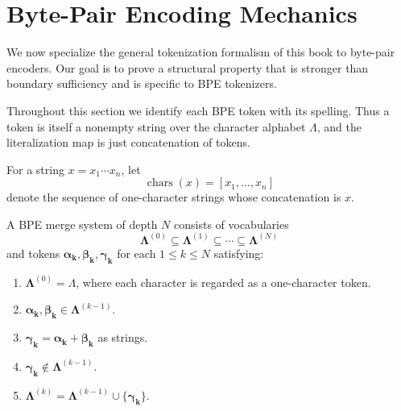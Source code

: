 \section{Byte-Pair Encoding Mechanics}
\label{sec:bpe-mechanics}
\label{sec:appendix-bpe-mechanics}

We now specialize the general tokenization formalism of this book to byte-pair encoders.
Our goal is to prove a structural property that is stronger than boundary sufficiency and is
specific to BPE tokenizers.

Throughout this section we identify each BPE token with its spelling.
Thus a token is itself a nonempty string over the character alphabet $\Lambda$,
and the literalization map is just concatenation of tokens.

\begin{definition}
    For a string $x = x_1 \cdots x_n$, let
    \[
    \operatorname{chars}(x) = [x_1, \ldots, x_n]
    \]
    denote the sequence of one-character strings whose concatenation is $x$.
\end{definition}

\begin{definition}
    A BPE merge system of depth $N$ consists of vocabularies
    \[
    \boldsymbol{\Lambda}^{(0)} \subseteq \boldsymbol{\Lambda}^{(1)} \subseteq \cdots \subseteq \boldsymbol{\Lambda}^{(N)}
    \]
    and tokens $\boldsymbol{\alpha_k}, \boldsymbol{\beta_k}, \boldsymbol{\gamma_k}$ for each
    $1 \leq k \leq N$ satisfying:
    \begin{enumerate}
        \item $\boldsymbol{\Lambda}^{(0)} = \Lambda$, where each character is regarded as a one-character token.
        \item $\boldsymbol{\alpha_k}, \boldsymbol{\beta_k} \in \boldsymbol{\Lambda}^{(k-1)}$.
        \item $\boldsymbol{\gamma_k} = \boldsymbol{\alpha_k} + \boldsymbol{\beta_k}$ as strings.
        \item $\boldsymbol{\gamma_k} \notin \boldsymbol{\Lambda}^{(k-1)}$.
        \item $\boldsymbol{\Lambda}^{(k)} = \boldsymbol{\Lambda}^{(k-1)} \cup \{\boldsymbol{\gamma_k}\}$.
    \end{enumerate}
\end{definition}

